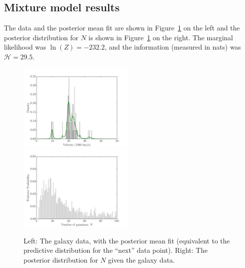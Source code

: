 \documentclass[article]{jss}
\begin{document}
\subsection{Mixture model results}
The data and the posterior mean fit are shown
in Figure~\ref{fig:galaxies} on the left and the posterior distribution for
$N$ is shown in Figure~\ref{fig:galaxies} on the right.
The marginal likelihood was $\ln(Z) = -232.2$, and
the information (measured in nats) was $\mathcal{H} = 29.5$.

\begin{figure}[t!]
\centering
\includegraphics[width=0.5\textwidth, trim = 0 5 20 15]{galaxies.pdf}%
\includegraphics[width=0.5\textwidth, trim = 0 5 20 15]{galaxies_N.pdf}
\caption{Left: The galaxy data, with the posterior mean fit
  (equivalent to the predictive distribution for the ``next'' data point).
  Right: The posterior distribution for $N$ given the
galaxy data.
\label{fig:galaxies}}
\end{figure}
\end{document}
